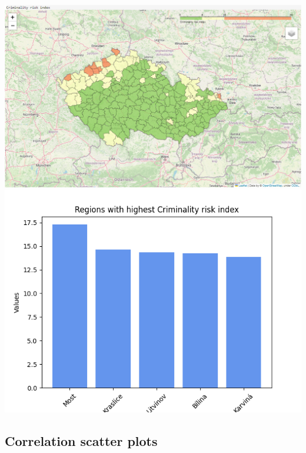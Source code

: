 \documentclass[a4paper, 12pt]{article}
\begin{document}
\begin{center}
    \includegraphics[width=.8\textwidth]{risk_index.png}
    \includegraphics[width=.8\textwidth]{Regions with highest Criminality risk index.png}
\end{center}
\subsection{Correlation scatter plots}
\end{document}
